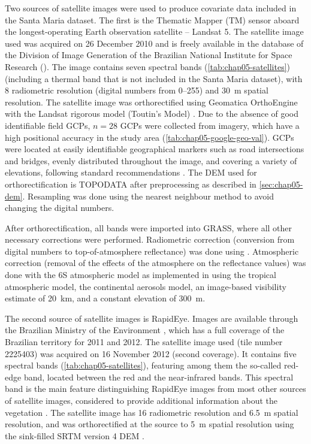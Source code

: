 Two sources of satellite images were used to produce covariate data included in the Santa Maria dataset. The 
first is the Thematic Mapper (TM) sensor aboard the longest-operating Earth observation satellite -- Landsat 
5. 
The satellite image used was acquired on \num{26} December \num{2010} and is freely available in the database 
of the Division of Image Generation of the Brazilian National Institute for Space Research (\inpedgi). The 
image contains seven spectral bands (\autoref{tab:chap05-satellites}) (including a thermal band that is not 
included in the Santa Maria dataset), with \SI{8}{\bit} radiometric resolution (digital numbers from 
\numrange{0}{255}) and \SI{30}{\m} spatial resolution. The satellite image was orthorectified using 
Geomatica\textregistered{} OrthoEngine\textregistered{} with the Landsat rigorous model (Toutin's Model) 
\cite{Toutin2004, PCIGeomatics2007}. Due to the absence of good identifiable field GCPs, $n = 28$ GCPs were 
collected from \googleearth{} imagery, which have a high positional accuracy in the study area 
(\autoref{tab:chap05-google-geo-val}). GCPs were located 
at easily identifiable geographical markers such as road intersections and bridges, evenly distributed 
throughout the image, and covering a variety of elevations, following standard recommendations 
\cite{PCIGeomatics2007}. 
The DEM used for orthorectification is TOPODATA after preprocessing as described in \autoref{sec:chap05-dem}. 
Resampling was done using the nearest neighbour method to avoid changing the digital numbers.

After orthorectification, all bands were imported into GRASS, where all other necessary corrections were 
performed. Radiometric correction (conversion from digital numbers to top-of-atmosphere reflectance) was done 
using . Atmospheric correction (removal of the effects of the atmosphere on the 
reflectance values) was done with the 6S atmospheric model \cite{VermoteEtAl1997} as implemented in 
 using the tropical atmospheric model, the continental aerosols model, an image-based 
visibility estimate of \SI{20}{\km}, and a constant elevation of \SI{300}{\m}.

The second source of satellite images is RapidEye. Images are available through the Brazilian Ministry of the 
Environment \cite{Brasil2012}, which has a full coverage of the Brazilian territory for \num{2011} and 
\num{2012}. The satellite image used (tile number \num{2225403}) was acquired on \num{16} November \num{2012} 
(second coverage). It contains five spectral bands 
(\autoref{tab:chap05-satellites}), featuring among them the so-called red-edge band, located between the red 
and the near-infrared bands. This spectral band is the main feature distinguishing RapidEye images from most 
other sources of satellite images, considered to provide additional information about the vegetation 
\cite{WeicheltEtAl2013}. The satellite image has \SI{16}{\bit} radiometric resolution and \SI{6.5}{\m} spatial 
resolution, and was orthorectified at the source to \SI{5}{\m} spatial resolution using the sink-filled SRTM 
version \num{4} DEM \cite{RapidEye2013}.

